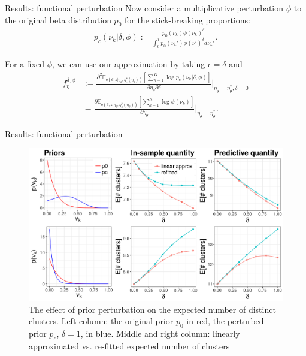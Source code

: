\documentclass[10pt]{beamer}\usepackage[]{graphicx}\usepackage[]{color}
\newenvironment{knitrout}{}{} %
\newcommand{\Expect}{\mathbb{E}}
\newcommand{\etazopt}{\eta_z^{*}}
\newcommand{\etathetaopt}{\eta_\theta^{*}}
\newcommand{\QExpect}
{\Expect_{q\left(\theta, z \vert \eta_\theta, \etazopt(\eta_\theta)\right)}}
\begin{document}
\begin{frame}{Results: functional perturbation}
Now consider a multiplicative perturbation $\phi$ to
the original beta distribution $p_0$ for the stick-breaking proportions:
%
\begin{align*}
\label{eq:expon_perturb}
	p_c(\nu_k \vert \delta, \phi) :=
  \frac{p_{0}(\nu_k)\phi(\nu_k)^\delta}
       {\int_0^1 p_0(\nu_k')\phi(\nu')^\delta d\nu_k'}.
\end{align*}

\pause 

For a fixed $\phi$, we can use our approximation by taking
$\epsilon = \delta$ and
%
\begin{align*}
f^{\delta,\phi}_\eta &:=
\frac{\partial^2
    \QExpect \left[ \sum_{k=1}^K \log p_c(\nu_k \vert \delta, \phi) \right]}
{\partial \eta_\theta \partial \delta}
    \Big\rvert_{\eta_\theta = \etathetaopt, \delta = 0} \\
    &=
\frac{\partial
    \QExpect \left[ \sum_{k=1}^K  \log\phi(\nu_k) \right]}
{\partial \eta_\theta}
    \Big\rvert_{\eta_\theta = \etathetaopt}.
\end{align*}

\end{frame}


\begin{frame}{Results: functional perturbation}
\begin{figure}
\centering

\begin{knitrout}
\color{fgcolor}

{\centering \includegraphics[width=0.98\linewidth,height=0.588\linewidth]{figure/functional_sens_plot_thresh0-1} 

}



\end{knitrout}
\caption{The effect of prior perturbation on the expected number of distinct clusters. Left column: the original prior $p_0$ in red, the perturbed prior $p_c$, $\delta = 1$, in blue. Middle and right column: linearly approximated vs.
re-fitted expected number of clusters}
\end{figure}

\end{frame}
\end{document}
